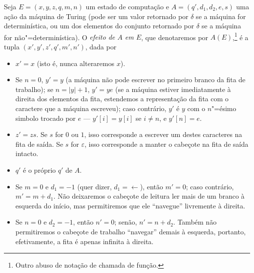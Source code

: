 Seja $E = (x, y, z, q, m, n)$ um estado de computação
e $A = (q', d_1, d_2, e, s)$ uma ação da máquina de Turing
(pode ser um valor retornado por $\delta$ se a máquina for determinística,
ou um dos elementos do conjunto retornado por $\delta$
se a máquina for não"=determinística).
O \emph{efeito de $A$ em $E$},
que denotaremos por $A(E)$,\footnote{
    Outro abuso de notação de chamada de função.
}
é a tupla $(x', y', z', q', m', n')$,
dada por
\begin{itemize}
    \setlength{\labelsep}{1ex}
    \item $x' = x$ (isto é, nunca alteraremos $x$).
    \item Se $n = 0$, $y' = y$
        (a máquina não pode escrever no primeiro branco da fita de trabalho);
        se $n = |y| + 1$, $y' = ye$
        (se a máquina estiver imediatamente à direita dos elementos da fita,
        estendemos a representação da fita com o caractere que a máquina escreveu);
        caso contrário,
        $y'$ é $y$ com o $n$"=ésimo simbolo trocado por $e$
        --- $y'[i] = y[i]$ se $i \neq n$, e $y'[n] = e$.
    \item $z' = zs$.
        Se $s$ for $0$ ou $1$,
        isso corresponde a escrever um destes caracteres na fita de saída.
        Se $s$ for $\varepsilon$,
        isso corresponde a manter o cabeçote na fita de saída intacto.
    \item $q'$ é o próprio $q'$ de $A$.
    \item Se $m = 0$ e $d_1 = -1$ (quer dizer, $d_1 = \leftarrow$),
        então $m' = 0$; caso contrário, $m' = m + d_1$.
        Não deixaremos o cabeçote de leitura ler mais de um branco
        à esquerda do início,
        mas permitiremos que ele ``navegue'' livremente à direita.
    \item Se $n = 0$ e $d_2 = -1$, então $n' = 0$; senão, $n' = n + d_2$.
        Também não permitiremos o cabeçote de trabalho ``navegar'' demais à esquerda,
        portanto, efetivamente,
        a fita é apenas infinita à direita.
\end{itemize}
